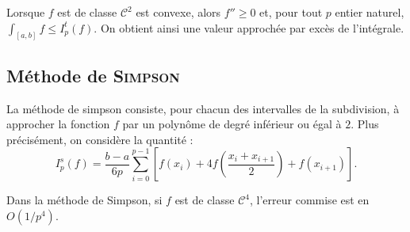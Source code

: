 \begin{remarque}
Lorsque $f$ est de classe $\mathscr{C}^2$ est convexe, alors $f'' \geq 0$ et, pour tout $p$ entier naturel, \mbox{$\int_{[a,b]} f \leq I_p^t(f)$}. On obtient ainsi une valeur approchée par excès de l'intégrale.
\end{remarque}

\subsection{Méthode de \textsc{Simpson}}

La méthode de simpson consiste, pour chacun des intervalles de la subdivision, à approcher la fonction $f$ par un polynôme de degré inférieur ou égal à $2$. Plus précisément, on considère la quantité :
\[
I_p^s(f) = \frac{b-a}{6 p} \sum_{i=0}^{p-1} \left[f(x_i)+ 4 f\left(\frac{x_i + x_{i+1}}{2}\right) + f(x_{i+1})\right].
\]

\begin{prop}{}{}
Dans la méthode de Simpson, si $f$ est de classe $\mathscr{C}^4$, l'erreur commise est en $O(1/p^4)$.
\end{prop}

